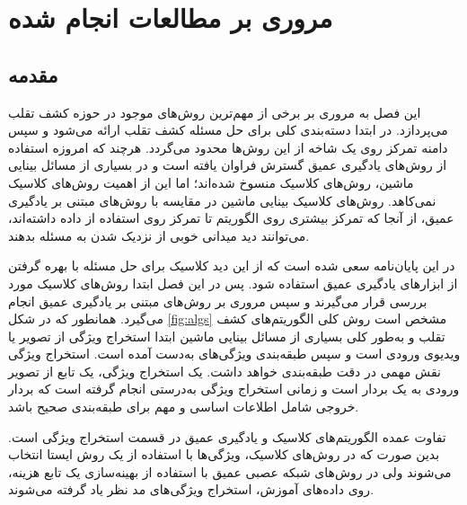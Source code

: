 
\chapter{مروری بر مطالعات انجام شده}
\section{مقدمه}
این فصل به مروری بر برخی از مهم‌ترین روش‌های موجود در حوزه کشف تقلب می‌پردازد. در ابتدا دسته‌بندی کلی برای حل مسئله کشف تقلب ارائه می‌شود و سپس دامنه تمرکز روی یک شاخه از این روش‌ها محدود می‌گردد. هرچند که امروزه استفاده از روش‌های یادگیری عمیق گسترش فراوان یافته است و در بسیاری از مسائل بینایی ماشین، روش‌های کلاسیک منسوخ شده‌اند؛ اما این از اهمیت روش‌های کلاسیک نمی‌کاهد.
روش‌های کلاسیک بینایی ماشین در مقایسه با روش‌های مبتنی بر یادگیری عمیق، از آنجا که تمرکز بیشتری روی الگوریتم تا تمرکز روی استفاده از داده داشته‌اند، می‌توانند دید میدانی خوبی از نزدیک شدن به مسئله بدهند.


در این پایان‌نامه سعی شده است که از این دید کلاسیک برای حل مسئله با بهره گرفتن از ابزارهای یادگیری عمیق استفاده شود. پس در این فصل ابتدا روش‌های کلاسیک مورد بررسی قرار می‌گیرند و سپس مروری بر روش‌های مبتنی بر یادگیری عمیق انجام می‌گیرد. 
همانطور که در شکل 
\ref{fig:algs}
مشخص است روش کلی الگوریتم‌های کشف تقلب و به‌طور کلی بسیاری از مسائل بینایی ماشین ابتدا استخراج ویژگی از تصویر یا ویدیوی ورودی است و سپس طبقه‌بندی ویژگی‌های به‌دست آمده است. استخراج ویژگی نقش مهمی در دقت طبقه‌بندی خواهد داشت. یک استخراج ویژگی، یک تابع از تصویر ورودی به یک بردار است و زمانی استخراج ویژگی به‌درستی انجام گرفته است که بردار خروجی شامل اطلاعات اساسی و مهم برای طبقه‌بندی صحیح باشد.

تفاوت عمده الگوریتم‌های کلاسیک و یادگیری عمیق در قسمت استخراج ویژگی است. بدین صورت که در روش‌های کلاسیک، ویژگی‌ها با استفاده از یک روش ایستا انتخاب می‌شوند ولی در روش‌های شبکه عصبی عمیق با استفاده از بهینه‌سازی یک تابع هزینه، روی داده‌های آموزش، استخراج ویژگی‌های مد نظر یاد گرفته می‌شوند.


